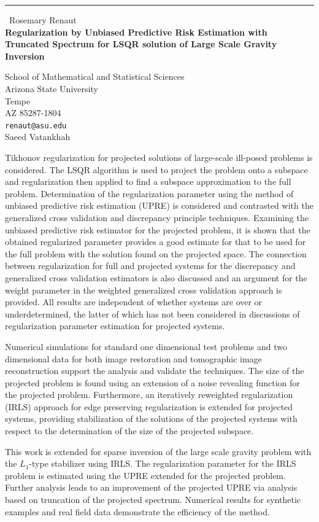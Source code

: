 \documentclass{report}
\begin{document}
\begin{center}
\rule{6in}{1pt} \
{\large Rosemary Renaut \\
{\bf Regularization by Unbiased Predictive Risk Estimation with Truncated Spectrum for LSQR solution of Large Scale Gravity Inversion}}

School of Mathematical and Statistical Sciences \\ Arizona State University \\ Tempe \\ AZ 85287-1804
\\
{\tt renaut@asu.edu}\\
Saeed  Vatankhah\end{center}

Tikhonov regularization for projected solutions of large-scale ill-posed
problems is considered. The LSQR algorithm is used to project the problem
onto a subspace and regularization then applied to find a subspace
approximation to the full problem. Determination of the regularization
parameter using the method of unbiased predictive risk estimation (UPRE)
is considered and contrasted with the generalized cross validation and
discrepancy principle techniques. Examining the unbiased predictive risk
estimator for the projected problem, it is shown that the obtained
regularized parameter provides a good estimate for that to be used for
the full problem with the solution found on the projected space. The
connection between regularization for full and projected systems for the
discrepancy and generalized cross validation estimators is also discussed
and an argument for the weight parameter in the weighted generalized
cross validation approach is provided. All results are independent of
whether systems are over or underdetermined, the latter of which has not
been considered in discussions of regularization parameter estimation for
projected systems.

Numerical simulations for standard one dimensional test problems and two
dimensional data for both image restoration and tomographic image
reconstruction support the analysis and validate the techniques. The size
of the projected problem is found using an extension of a noise revealing
function for the projected problem. Furthermore, an iteratively
reweighted regularization (IRLS) approach for edge preserving
regularization is extended for projected systems, providing stabilization
of the solutions of the projected systems with respect to the
determination of the size of the projected subspace.

This work is extended for sparse inversion of the large scale gravity
problem with the $L_{1}$-type stabilizer using IRLS. The regularization
parameter for the IRLS problem is estimated using the UPRE extended for
the projected problem. Further analysis leads to an improvement of the
projected UPRE via analysis based on truncation of the projected
spectrum. Numerical results for synthetic examples and real field data
demonstrate the efficiency of the method.
\end{document}
